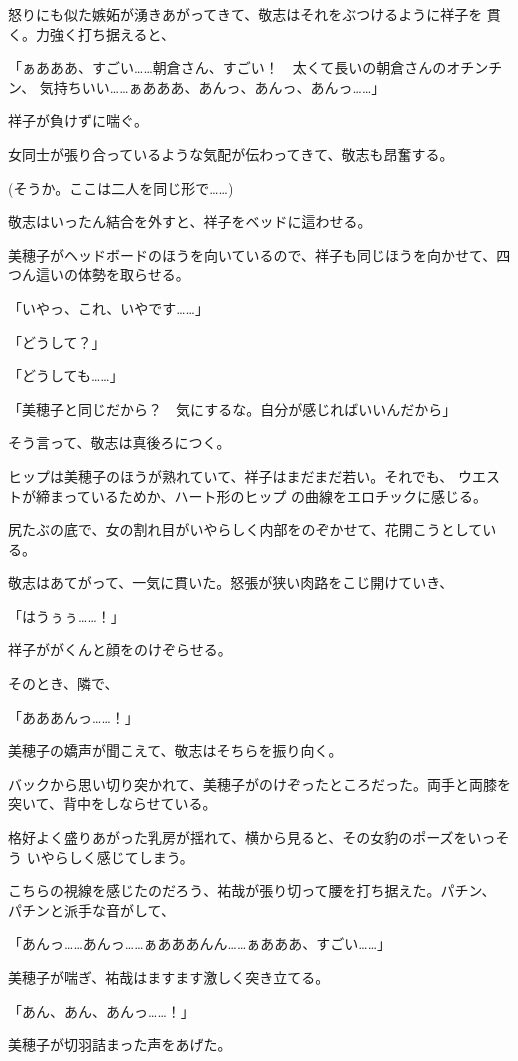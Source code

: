 ﻿\documentclass[
    book,tate,
    line_length=30zw,
    jafontsize=12pt,
    paper=b5j,
    landscape,
    ]{jlreq}
\begin{document}
怒りにも似た嫉妬が湧きあがってきて、敬志はそれをぶつけるように祥子を
貫く。力強く打ち据えると、

「ぁあああ、すごい……朝倉さん、すごい！　太くて長いの朝倉さんのオチンチン、
気持ちいい……ぁあああ、あんっ、あんっ、あんっ……」

祥子が負けずに喘ぐ。

女同士が張り合っているような気配が伝わってきて、敬志も昂奮する。

(そうか。ここは二人を同じ形で……)

敬志はいったん結合を外すと、祥子をベッドに這わせる。

美穂子がヘッドボードのほうを向いているので、祥子も同じほうを向かせて、四つん這いの体勢を取らせる。

「いやっ、これ、いやです……」

「どうして？」

「どうしても……」

「美穂子と同じだから？　気にするな。自分が感じればいいんだから」

そう言って、敬志は真後ろにつく。

ヒップは美穂子のほうが熟れていて、祥子はまだまだ若い。それでも、
ウエストが締まっているためか、ハート形のヒップ の曲線をエロチックに感じる。

尻たぶの底で、女の割れ目がいやらしく内部をのぞかせて、花開こうとしている。

敬志はあてがって、一気に貫いた。怒張が狭い肉路をこじ開けていき、

「はうぅぅ……！」

祥子ががくんと顔をのけぞらせる。

そのとき、隣で、

「あああんっ……！」

美穂子の嬌声が聞こえて、敬志はそちらを振り向く。

バックから思い切り突かれて、美穂子がのけぞったところだった。両手と両膝を
突いて、背中をしならせている。

格好よく盛りあがった乳房が揺れて、横から見ると、その女豹のポーズをいっそう
いやらしく感じてしまう。

こちらの視線を感じたのだろう、祐哉が張り切って腰を打ち据えた。パチン、
パチンと派手な音がして、

「あんっ……あんっ……ぁあああんん……ぁあああ、すごい……」

美穂子が喘ぎ、祐哉はますます激しく突き立てる。

「あん、あん、あんっ……！」

美穂子が切羽詰まった声をあげた。
\end{document}
